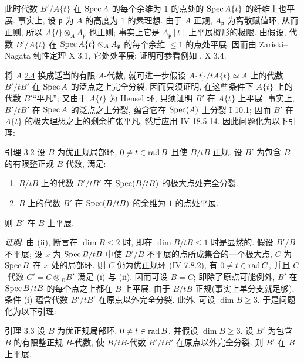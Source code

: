 此时代数 $B'/A\{t\}$ 在 $\operatorname{Spec} A$ 的每个余维为 $1$ 的点处的 $\operatorname{Spec} A\{t\}$ 的纤维上也平展. 事实上, 设 $\mathfrak{p}$ 为 $A$ 的高度为 $1$ 的素理想. 由于 $A$ 正规, $A_{\mathfrak{p}}$ 为离散赋值环, 从而正则, 所以 $A\{t\}\otimes_A A_{\mathfrak{p}}$ 也正则; 事实上它是 $A_{\mathfrak{p}}[t]$ 上平展概形的极限. 由假设, 代数 $B'/A\{t\}$ 在 $\operatorname{Spec} A\{t\}\otimes_A A_{\mathfrak{p}}$ 的每个余维 $\leq 1$ 的点处平展, 因而由 Zariski--Nagata 纯性定理 \sisi{(}{} X 3.1\sisi{)}{}, 它处处平展; 证明可参看例如 , X 3.4.

将 $A$ \sisi{(}{}\hyperref[XV.cor2.4]{2.4}\sisi{)}{} 换成适当的有限 $A$-代数, 就可进一步假设 $A\{t\}/tA\{t\}\simeq A$ 上的代数 $B'/tB'$ 在 $\operatorname{Spec} A$ 的泛点之上完全分裂. 因而只须证明, 在这些条件下 $A\{t\}$ 上的代数 $B'$\pageoriginale “平凡”; 又由于 $A\{t\}$ 为 Hensel 环, 只须证明 $B'$ 在 $A\{t\}$ 上平展. 事实上, $B'/tB'$ 在 $\operatorname{Spec} A$ 的泛点之上分裂, 蕴含它在 $\operatorname{Spec}(A)$ 上分裂 \sisi{(}{} I 10.1\sisi{)}{}; 因而 $B'$ 在 $A\{t\}$ 的极大理想之上的剩余扩张平凡, 然后应用 \EGA IV 18.5.14. 因此问题化为以下引理:

\begin{enonce*}{引理 3.2}
设 $B$ 为优正规局部环, $0\neq t\in \operatorname{rad} B$ 且使 $B/tB$ 正规. 设 $B'$ 为包含 $B$ 的有限整正规 $B$-代数, 满足:
\begin{enumerate}
\renewcommand{\theenumi}{\roman{enumi}}
\renewcommand{\labelenumi}{(\theenumi)}
\item $B/tB$ 上的代数 $B'/tB'$ 在 $\operatorname{Spec}(B/tB)$ 的极大点处完全分裂.

\item $B$ 上的代数 $B'$ 在 $\operatorname{Spec}(B/tB)$ 的余维为 $1$ 的点处平展.
\end{enumerate}
则 $B'$ 在 $B$ 上平展.
\end{enonce*}

\noindent
\emph{证明}. 由 (ii), 断言在 $\dim B\leq 2$ 时, 即在 $\dim B/tB\leq 1$ 时是显然的. 假设 $B'/B$ 不平展; 设 $x$ 为 $\operatorname{Spec} B/tB$ 中使 $B'/B$ 不平展的点所成集合的一个极大点, $C$ 为 $\operatorname{Spec} B$ 在 $x$ 处的局部环. 则 $C$ 仍为优正规环 (\EGA IV 7.8.2), 有 $0\neq t\in\operatorname{rad} C$, 并且 $C$-代数 $C'=C\otimes {}_BB'$ 满足 (i) 与 (ii). 因而可设 $B=C$; 即除了原点可能例外, $B'$ 在 $\operatorname{Spec} B/tB$ 的每个点之上都在 $B$ 上平展. 由于 $B/tB$ 正规\pageoriginale (事实上单分支就足够), 条件 (i) 蕴含代数 $B'/tB'$ 在原点以外完全分裂. 此外, 可设 $\dim B\geq 3$. 于是问题化为以下引理:

\begin{enonce*}{引理 3.3}
设 $B$ 为优正规局部环, $0\neq t\in \operatorname{rad} B$, 并假设 $\dim B\geq 3$. 设 $B'$ 为包含 $B$ 的有限整正规 $B$-代数, 使 $B/tB$-代数 $B'/tB'$ 在原点以外完全分裂. 则 $B'$ 在 $B$ 上平展.
\end{enonce*}

